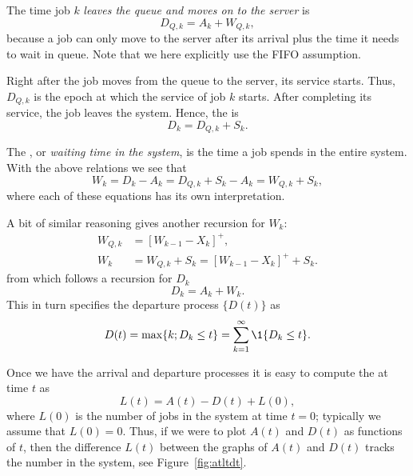 The time job $k$ \emph{leaves the queue and moves on to the server} is
\begin{equation*}
 D_{Q,k} = A_k + W_{Q,k},
\end{equation*}
because a job can only move to the server after its arrival plus the
time it needs to wait in queue.  Note that we here explicitly use the
FIFO assumption.

Right after the job moves from the
queue to the server, its service starts.  Thus, $D_{Q,k}$ is the epoch
at which the service of job $k$ starts. After completing its service,
the job leaves the system. Hence, the  is
\begin{equation*}
  D_k = D_{Q,k} + S_k.
\end{equation*}

The , or \emph{waiting time in the system}, is the
time a job spends in the entire system. With the above relations we
see that
\begin{equation}
  W_k = D_k - A_k = D_{Q,k} + S_k -A_k = W_{Q,k} + S_k,
\end{equation}
where each of these equations has its own interpretation. 

A bit of similar reasoning gives another recursion for $W_k$:
\begin{equation}
  \label{eq:59}
  \begin{split}
  W_{Q,k} &= [W_{k-1} - X_k]^+,\\
  W_{k} &= W_{Q,k} + S_k = [W_{k-1} - X_k]^+ + S_k.
  \end{split}
\end{equation}
from which follows a recursion for $D_k$
\begin{equation}
  D_k = A_k + W_k.
\end{equation}
This in turn specifies the departure process $\{D(t)\}$ as
\begin{equation*}
  D(t) = \max\{k; D_k \leq t\} = \sum_{k=1}^\infty \1{D_k \leq t}.
\end{equation*}

Once we have the arrival and departure processes it is easy to compute
the  at time $t$ as
\begin{equation}\label{eq:14}
  L(t) = A(t) - D(t) + L(0),
\end{equation}
where $L(0)$ is the number of jobs in the system at time $t=0$;
typically we assume that $L(0)=0$. Thus, if we were to plot $A(t)$ and
$D(t)$ as functions of $t$, then the difference $L(t)$ between the
graphs of $A(t)$ and $D(t)$ tracks the number in the system, see
Figure~\ref{fig:atltdt}. 

